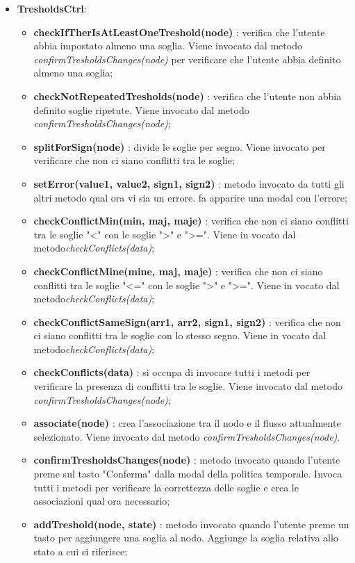 \begin{itemize}
\begin{itemize}
			\end{itemize}
		\item \textbf{TresholdsCtrl}: 
			\begin{itemize}
				\item \textbf{checkIfTherIsAtLeastOneTreshold(node)} : verifica che l'utente abbia impostato almeno una soglia. Viene invocato dal metodo \textit{confirmTresholdsChanges(node)} per verificare che l'utente abbia definito almeno una soglia;
				\item \textbf{checkNotRepeatedTresholds(node)} : verifica che l'utente non abbia definito soglie ripetute. Viene invocato dal metodo \textit{confirmTresholdsChanges(node)};
				\item \textbf{splitForSign(node)} : divide le soglie per segno. Viene invocato per verificare che non ci siano conflitti tra le soglie;
				\item \textbf{setError(value1, value2, sign1, sign2)} : metodo invocato da tutti gli altri metodo qual ora vi sia un errore. fa apparire una modal con l'errore;
				\item \textbf{checkConflictMin(min, maj, maje)} : verifica che non ci siano conflitti tra le soglie "<" con le soglie ">" e ">=". Viene in vocato dal metodo\textit{checkConflicts(data)};
				\item \textbf{checkConflictMine(mine, maj, maje)} : verifica che non ci siano conflitti tra le soglie "<=" con le soglie ">" e ">=". Viene in vocato dal metodo\textit{checkConflicts(data)};
				\item \textbf{checkConflictSameSign(arr1, arr2, sign1, sign2)} : verifica che non ci siano conflitti tra le soglie con lo stesso segno. Viene in vocato dal metodo\textit{checkConflicts(data)};
				\item \textbf{checkConflicts(data)} : si occupa di invocare tutti i metodi per verificare la presenza di conflitti tra le soglie. Viene invocato dal metodo \textit{confirmTresholdsChanges(node)};
				\item \textbf{associate(node)} : crea l'associazione tra il nodo e il flusso attualmente selezionato. Viene invocato dal metodo \textit{confirmTresholdsChanges(node)}.
				\item \textbf{confirmTresholdsChanges(node)} : metodo invocato quando l'utente preme sul tasto "Conferma" dalla modal della politica temporale. Invoca tutti i metodi per verificare la correttezza delle soglie e crea le associazioni qual ora necessario;
				\item \textbf{addTreshold(node, state)} : metodo invocato quando l'utente preme un tasto per aggiungere una soglia al nodo. Aggiunge la soglia relativa allo stato a cui si riferisce;

\end{itemize}
\end{itemize}

